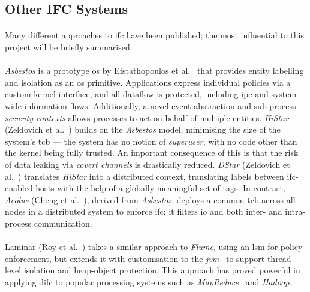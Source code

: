 \subsection{Other IFC Systems}
\paragraph{} Many different approaches to \acrshort{ifc} have been published; the most influential to this project will be briefly summarised.

\paragraph{} \textit{Asbestos} is a prototype \acrshort{os} by Efstathopoulos et al.~\cite{asbestos} that provides entity labelling and isolation as an \acrshort{os} primitive. Applications express individual policies via a custom kernel interface, and all dataflow is protected, including \acrshort{ipc} and system-wide information flows. Additionally, a novel event abstraction and sub-process \textit{security contexts} allows processes to act on behalf of multiple entities. \textit{HiStar} (Zeldovich et al.~\cite{10.5555/1298455.1298481}) builds on the \textit{Asbestos} model, minimising the size of the system's \acrshort{tcb} --- the system has no notion of \textit{superuser}, with no code other than the kernel being fully trusted. An important consequence of this is that the risk of data leaking via \textit{covert channels} is drastically reduced. \textit{DStar} (Zeldovich et al.~\cite{10.5555/1387589.1387610}) translates \textit{HiStar} into a distributed context, translating labels between \acrshort{ifc}-enabled hosts with the help of a globally-meaningful set of tags. In contrast, \textit{Aeolus} (Cheng et al.~\cite{10.5555/2342821.2342833}), derived from \textit{Asbestos}, deploys a common \acrshort{tcb} across all nodes in a distributed system to enforce \acrshort{ifc}; it filters \acrshort{io} and both inter- and intra- process communication.

\paragraph{} Laminar (Roy et al.~\cite{10.1145/1543135.1542484}) takes a similar approach to \textit{Flume}, using an \acrshort{lsm} for policy enforcement, but extends it with customisation to the \textit{\acrfull{jvm}}~\cite{jvm} to support thread-level isolation and heap-object protection. This approach has proved powerful in applying \acrshort{difc} to popular processing systems such as \textit{MapReduce}~\cite{mapreduce} and \textit{Hadoop}.~\cite{hadoop}


